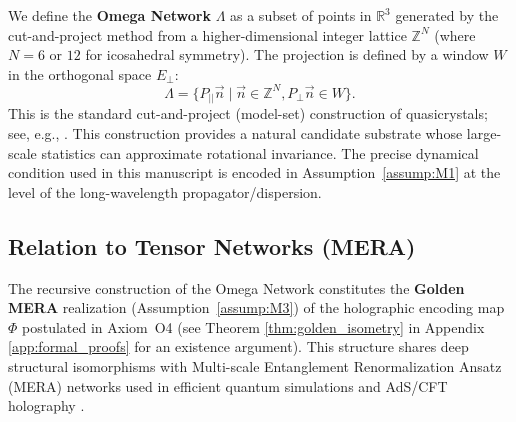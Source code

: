 We define the \textbf{Omega Network} $\Lambda$ as a subset of points in $\mathbb{R}^3$ generated by the cut-and-project method from a higher-dimensional integer lattice $\mathbb{Z}^N$ (where $N=6$ or $12$ for icosahedral symmetry). The projection is defined by a window $W$ in the orthogonal space $E_\perp$:
\begin{equation}
    \Lambda = \{ P_{||} \vec{n} \mid \vec{n} \in \mathbb{Z}^N, P_{\perp} \vec{n} \in W \}.
\end{equation}
This is the standard cut-and-project (model-set) construction of quasicrystals; see, e.g., \cite{Senechal1995,BaakeGrimm2013AperiodicOrder}.
This construction provides a natural candidate substrate whose large-scale statistics can approximate rotational invariance. The precise dynamical condition used in this manuscript is encoded in Assumption~\ref{assump:M1} at the level of the long-wavelength propagator/dispersion.

\subsection{Relation to Tensor Networks (MERA)}
The recursive construction of the Omega Network constitutes the \textbf{Golden MERA} realization (Assumption~\ref{assump:M3}) of the holographic encoding map $\Phi$ postulated in Axiom~O4 (see Theorem \ref{thm:golden_isometry} in Appendix \ref{app:formal_proofs} for an existence argument). This structure shares deep structural isomorphisms with Multi-scale Entanglement Renormalization Ansatz (MERA) networks used in efficient quantum simulations and AdS/CFT holography \cite{Vidal2007MERA,Swingle2012MERA,Pastawski2015,Harlow2017}.

